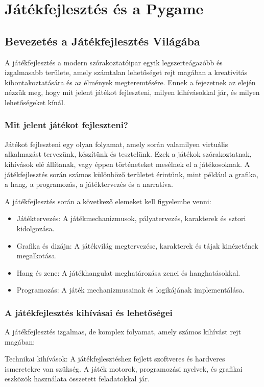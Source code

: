 \chapter{Játékfejlesztés és a Pygame}

\section{Bevezetés a Játékfejlesztés Világába}

A játékfejlesztés a modern szórakoztatóipar egyik legszerteágazóbb és izgalmasabb területe, amely számtalan lehetőséget rejt magában a kreativitás kibontakoztatására és az élmények megteremtésére. Ennek a fejezetnek az elején nézzük meg, hogy mit jelent játékot fejleszteni, milyen kihívásokkal jár, és milyen lehetőségeket kínál.

\subsection{Mit jelent játékot fejleszteni?}
Játékot fejleszteni egy olyan folyamat, amely során valamilyen virtuális alkalmazást tervezünk, készítünk és tesztelünk. Ezek a játékok szórakoztatnak, kihívások elé állítanak, vagy éppen történeteket mesélnek el a játékosoknak. A játékfejlesztés során számos különböző területet érintünk, mint például a grafika, a hang, a programozás, a játéktervezés és a narratíva.

A játékfejlesztés során a következő elemeket kell figyelembe venni:

\begin{itemize}
    
    \item Játéktervezés: A játékmechanizmusok, pályatervezés, karakterek és sztori kidolgozása.
    \item Grafika és dizájn: A játékvilág megtervezése, karakterek és tájak kinézetének megalkotása.
    \item Hang és zene: A játékhangulat meghatározása zenei és hanghatásokkal.
    \item Programozás: A játék mechanizmusainak és logikájának implementálása.
\end{itemize}
\subsection{A játékfejlesztés kihívásai és lehetőségei}
A játékfejlesztés izgalmas, de komplex folyamat, amely számos kihívást rejt magában:

Technikai kihívások: A játékfejlesztéshez fejlett szoftveres és hardveres ismeretekre van szükség. A játék motorok, programozási nyelvek, és grafikai eszközök használata összetett feladatokkal jár.


